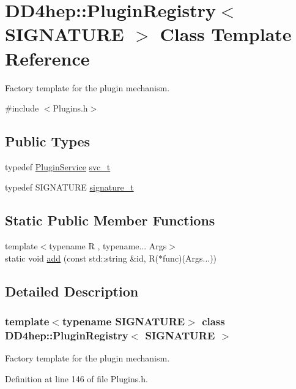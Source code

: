 \hypertarget{class_d_d4hep_1_1_plugin_registry}{
\section{DD4hep::PluginRegistry$<$ SIGNATURE $>$ Class Template Reference}
\label{class_d_d4hep_1_1_plugin_registry}
}


Factory template for the plugin mechanism.  


{\ttfamily \#include $<$Plugins.h$>$}\subsection*{Public Types}
\begin{DoxyCompactItemize}
\item 
typedef \hyperlink{class_d_d4hep_1_1_plugin_service}{PluginService} \hyperlink{class_d_d4hep_1_1_plugin_registry_a4a7136b1696a7da6212af835482dece9}{svc\_\-t}
\item 
typedef SIGNATURE \hyperlink{class_d_d4hep_1_1_plugin_registry_a7027450dd9c05ba16111485082222ade}{signature\_\-t}
\end{DoxyCompactItemize}
\subsection*{Static Public Member Functions}
\begin{DoxyCompactItemize}
\item 
{\footnotesize template$<$typename R , typename... Args$>$ }\\static void \hyperlink{class_d_d4hep_1_1_plugin_registry_a85c15e78a251333b0cfc3b47f6b0172f}{add} (const std::string \&id, R($\ast$func)(Args...))
\end{DoxyCompactItemize}


\subsection{Detailed Description}
\subsubsection*{template$<$typename SIGNATURE$>$ class DD4hep::PluginRegistry$<$ SIGNATURE $>$}

Factory template for the plugin mechanism. 

Definition at line 146 of file Plugins.h.

